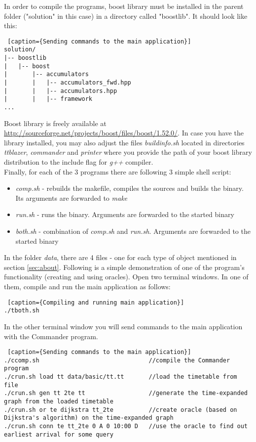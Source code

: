 	In order to compile the programs, boost library must be installed in the parent folder ("solution" in this case) in a directory called "boostlib". It should look like this:

\begin{lstlisting} [caption={Sending commands to the main application}]	
solution/
|-- boostlib
|   |-- boost
|       |-- accumulators
|       |   |-- accumulators_fwd.hpp
|       |   |-- accumulators.hpp
|       |   |-- framework
...
\end{lstlisting}

		Boost library is freely available at \url{http://sourceforge.net/projects/boost/files/boost/1.52.0/}. In case you have the library installed, you may also adjust the files \textit{buildinfo.sh} located in directories \textit{ttblazer}, \textit{commander} and \textit{printer} where you provide the path of your boost library distribution to the include flag for \textit{g++} compiler. \\
	
	Finally, for each of the 3 programs there are following 3 simple shell script:
	\begin{itemize}
		\item \textit{comp.sh} - rebuilds the makefile, compiles the sources and builds the binary. Its arguments are forwarded to \textit{make}
		\item \textit{run.sh} - runs the binary. Arguments are forwarded to the started binary
		\item \textit{both.sh} - combination of \textit{comp.sh} and \textit{run.sh}. Arguments are forwarded to the started binary
	\end{itemize}
	\hspace{\fill}	
	
	In the folder \textit{data}, there are 4 files - one for each type of object mentioned in section \ref{sec:about}. Following is a simple demonstration of one of the program's functionality (creating and using oracles). Open two terminal windows. In one of them, compile and run the main application as follows:
	
	\begin{lstlisting} [caption={Compiling and running main application}]
./tboth.sh
	\end{lstlisting}

	In the other terminal window you will send commands to the main application with the Commander program.	

	\begin{lstlisting} [caption={Sending commands to the main application}]
./ccomp.sh                               //compile the Commander program
./crun.sh load tt data/basic/tt.tt       //load the timetable from file
./crun.sh gen tt 2te tt                  //generate the time-expanded graph from the loaded timetable
./crun.sh or te dijkstra tt_2te          //create oracle (based on Dijkstra's algorithm) on the time-expanded graph
./crun.sh conn te tt_2te 0 A 0 10:00 D   //use the oracle to find out earliest arrival for some query
	\end{lstlisting}		
	

